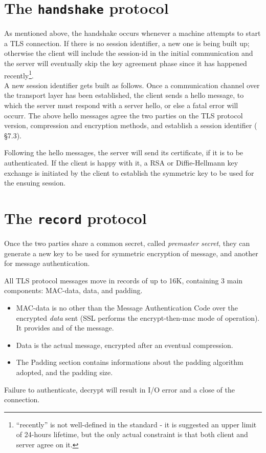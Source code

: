 \section{The \texttt{handshake} protocol}
As mentioned above, the handshake occurs whenever a machine attempts to start
a TLS connection. If there is no session identifier, a new one is being built
up; otherwise the client will include the session-id in the initial
communication and the server will eventually skip the key agreement phase since
it has happened recently\footnote{``recently'' is not well-defined in
  the standard - it is suggested an upper limit of 24-hours lifetime, but the
  only actual constraint is that both client and server agree on it.}.\\
A new session identifier gets built as follows. Once a communication channel
over the transport layer has been established, the client sends a hello
message, to which the server must respond with a server hello, or else a fatal error
will occurr. The above hello messages agree the two parties on the TLS protocol
version, compression and encryption methods, and  establish a session identifier
(\cite{rfc2246} \S 7.3).

Following the hello messages, the server will send its certificate,
if it is to be authenticated. If the client is happy with it, a RSA or
Diffie-Hellmann key exchange is initiated by the client to establish the
symmetric key to be used for the ensuing session.

\section{The \texttt{record} protocol}
Once the two parties share a common secret, called \emph{premaster secret},
they can generate a new key to be used for symmetric encryption of message, and
another for message authentication.

All TLS protocol messages move in records of up to 16K, containing 3
main components: MAC-data, data, and padding.
\begin{itemize}
\item {MAC-data} is no other than the Message Authentication Code over the
encrypted \emph{data} sent
(SSL performs the encrypt-then-mac mode of operation).
It provides  and  of the message.
\item {Data} is the actual message, encrypted after an eventual compression.
\item The {Padding} section contains informations about the padding algorithm
adopted, and the padding size.
\end{itemize}
Failure to authenticate, decrypt will result in I/O error and a close of the
connection.

